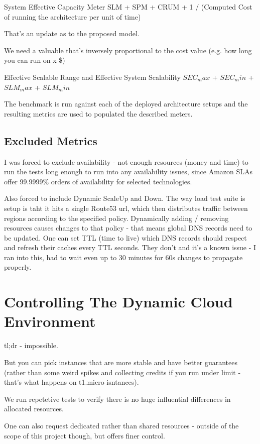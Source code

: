 \documentclass{uvamscse}
\begin{document}
System Effective Capacity Meter
SLM + SPM + CRUM + 1 / (Computed Cost of running the architecture per unit of time)

That's an update as to the proposed model.

We need a valuable that's inversely proportional to the cost value (e.g. how long you can run on x \$)

Effective Scalable Range and Effective System Scalability
$SEC_max$ + $SEC_min$ + $SLM_max$ + $SLM_min$

The benchmark is run against each of the deployed architecture setups and the resulting metrics are used to populated the described meters.

\subsection{Excluded Metrics}

I was forced to exclude availability - not enough resources (money and time) to run the tests long enough to run into any availability issues, since Amazon SLAs offer 99.9999\% orders of availability for selected technologies.

Also forced to include Dynamic ScaleUp and Down. The way load test suite is setup is taht it hits a single Route53 url, which then distributes traffic between regions according to the specified policy. Dynamically adding / removing resources causes changes to that policy - that means global DNS records need to be updated. One can set TTL (time to live) which DNS records should respect and refresh their caches every TTL seconds. They don't and it's a known issue - I ran into this, had to wait even up to 30 minutes for 60s changes to propagate properly.

\section{Controlling The Dynamic Cloud Environment}
tl;dr - impossible.

But you can pick instances that are more stable and have better guarantees (rather than some weird spikes and collecting credits if you run under limit - that's what happens on t1.micro isntances).

We run repetetive tests to verify there is no huge influential differences in allocated resources.

One can also request dedicated rather than shared resources - outside of the scope of this project though, but offers finer control.
\end{document}
